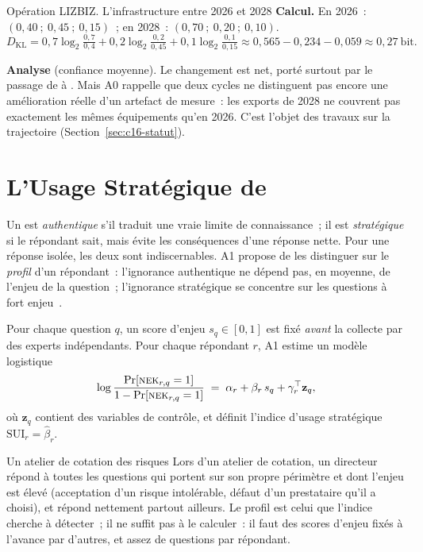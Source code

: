 \begin{boxscenario}{Opération LIZBIZ. L'infrastructure entre 2026 et 2028}
\textbf{Calcul.} En 2026~: $(0{,}40~;~0{,}45~;~0{,}15)$~; en 2028~:
$(0{,}70~;~0{,}20~;~0{,}10)$.
\[
D_{\mathrm{KL}} = 0{,}7\log_2\tfrac{0{,}7}{0{,}4} + 0{,}2\log_2\tfrac{0{,}2}{0{,}45}
  + 0{,}1\log_2\tfrac{0{,}1}{0{,}15} \approx 0{,}565 - 0{,}234 - 0{,}059
  \approx 0{,}27~\text{bit}.
\]

\textbf{Analyse} (confiance moyenne). Le changement est net, porté surtout
par le passage de \NON{} à \OUI{}. Mais A0 rappelle que deux cycles ne
distinguent pas encore une amélioration réelle d'un artefact de mesure~:
les exports de 2028 ne couvrent pas exactement les mêmes équipements qu'en
2026. C'est l'objet des travaux sur la trajectoire (Section~\ref{sec:c16-statut}).
\end{boxscenario}

\section{L'Usage Stratégique de \NEK{}}
\label{sec:c16-sui}

Un \NEK{} est \emph{authentique} s'il traduit une vraie limite de
connaissance~; il est \emph{stratégique} si le répondant sait, mais évite
les conséquences d'une réponse nette. Pour une réponse isolée, les deux
sont indiscernables. A1 propose de les distinguer sur le \emph{profil} d'un
répondant~: l'ignorance authentique ne dépend pas, en moyenne, de l'enjeu
de la question~; l'ignorance stratégique se concentre sur les questions à
fort enjeu~\cite{minka2026nek}.

Pour chaque question $q$, un score d'enjeu $s_q \in [0,1]$ est fixé
\emph{avant} la collecte par des experts indépendants. Pour chaque
répondant $r$, A1 estime un modèle logistique
\[
    \log \frac{\Pr[\textsc{nek}{}_{r,q} = 1]}{1 - \Pr[\textsc{nek}{}_{r,q} = 1]}
    \;=\; \alpha_r + \beta_r\, s_q + \gamma_r^{\top} \mathbf{z}_q,
\]
où $\mathbf{z}_q$ contient des variables de contrôle, et définit l'indice
d'usage stratégique $\mathrm{SUI}_r = \hat\beta_r$.

\begin{boxscenario}{Un atelier de cotation des risques}
Lors d'un atelier de cotation, un directeur répond \NEK{} à toutes les
questions qui portent sur son propre périmètre et dont l'enjeu est élevé
(acceptation d'un risque intolérable, défaut d'un prestataire qu'il a
choisi), et répond nettement partout ailleurs. Le profil est celui que
l'indice cherche à détecter~; il ne suffit pas à le calculer~: il faut des
scores d'enjeu fixés à l'avance par d'autres, et assez de questions par
répondant.
\end{boxscenario}

